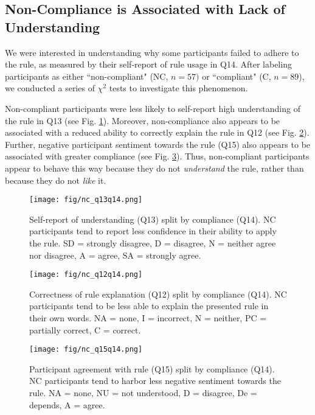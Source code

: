 \documentclass{article}
\begin{document}
\subsection{Non-Compliance is Associated with Lack of Understanding} \label{results:a:non-comp}

We were interested in understanding why some participants failed to adhere to the rule, as measured by their self-report of rule usage in Q14. 
After labeling participants as either ``non-compliant" (NC, $n=57)$ or ``compliant" (C, $n=89$), we conducted a series of $\chi^2$ tests to investigate this phenomenon.

Non-compliant participants were less likely to self-report high understanding of the rule in Q13 (see Fig. \ref{fig:q13q14}). Moreover, non-compliance also appears to be associated with a reduced ability to correctly explain the rule in Q12 (see Fig. \ref{fig:q12q14}). Further, negative participant sentiment towards the rule (Q15) also appears to be associated with greater compliance (see Fig. \ref{fig:q15q14}). Thus, non-compliant participants appear to behave this way because they do not \emph{understand} the rule, rather than because they do not \emph{like} it. 


\begin{figure}[h]
    \centering
    \texttt{[image: fig/nc\_q13q14.png]}
    \vspace{-15pt}
    \caption{Self-report of understanding (Q13) split by compliance (Q14). NC participants tend to report less confidence in their ability to apply the rule. SD = strongly disagree, D = disagree, N = neither agree nor disagree, A = agree, SA = strongly agree.}
    \label{fig:q13q14}
    \vspace{-5pt}
\end{figure}

\begin{figure}[h]
    \centering
    \texttt{[image: fig/nc\_q12q14.png]}
    \vspace{-15pt}
    \caption{Correctness of rule explanation (Q12) split by compliance (Q14). NC participants tend to be less able to explain the presented rule in their own words. NA = none, I = incorrect, N = neither, PC = partially correct, C = correct.}
    \label{fig:q12q14}
    \vspace{-5pt}
\end{figure}

\begin{figure}[h]
    \centering
    \texttt{[image: fig/nc\_q15q14.png]}
    \vspace{-15pt}
    \caption{Participant agreement with rule (Q15) split by compliance (Q14). NC participants tend to harbor less negative sentiment towards the rule. NA = none, NU = not understood, D = disagree, De = depends, A = agree.}
    \label{fig:q15q14}
    \vspace{-5pt}
\end{figure}
\end{document}
